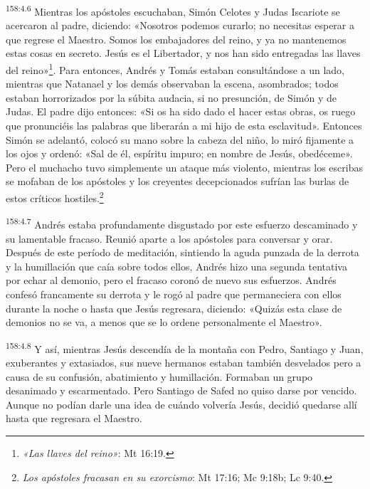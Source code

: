 \par
\textsuperscript{158:4.6} Mientras los apóstoles escuchaban, Simón Celotes y Judas Iscariote se acercaron al padre, diciendo: «Nosotros podemos curarlo; no necesitas esperar a que regrese el Maestro. Somos los embajadores del reino, y ya no mantenemos estas cosas en secreto. Jesús es el Libertador, y nos han sido entregadas las llaves del reino»\footnote{\textit{«Las llaves del reino»}: Mt 16:19.}. Para entonces, Andrés y Tomás estaban consultándose a un lado, mientras que Natanael y los demás observaban la escena, asombrados; todos estaban horrorizados por la súbita audacia, si no presunción, de Simón y de Judas. El padre dijo entonces: «Si os ha sido dado el hacer estas obras, os ruego que pronunciéis las palabras que liberarán a mi hijo de esta esclavitud». Entonces Simón se adelantó, colocó su mano sobre la cabeza del niño, lo miró fijamente a los ojos y ordenó: «Sal de él, espíritu impuro; en nombre de Jesús, obedéceme». Pero el muchacho tuvo simplemente un ataque más violento, mientras los escribas se mofaban de los apóstoles y los creyentes decepcionados sufrían las burlas de estos críticos hostiles.\footnote{\textit{Los apóstoles fracasan en su exorcismo}: Mt 17:16; Mc 9:18b; Lc 9:40.}

\par
\textsuperscript{158:4.7} Andrés estaba profundamente disgustado por este esfuerzo descaminado y su lamentable fracaso. Reunió aparte a los apóstoles para conversar y orar. Después de este período de meditación, sintiendo la aguda punzada de la derrota y la humillación que caía sobre todos ellos, Andrés hizo una segunda tentativa por echar al demonio, pero el fracaso coronó de nuevo sus esfuerzos. Andrés confesó francamente su derrota y le rogó al padre que permaneciera con ellos durante la noche o hasta que Jesús regresara, diciendo: «Quizás esta clase de demonios no se va, a menos que se lo ordene personalmente el Maestro».

\par
\textsuperscript{158:4.8} Y así, mientras Jesús descendía de la montaña con Pedro, Santiago y Juan, exuberantes y extasiados, sus nueve hermanos estaban también desvelados pero a causa de su confusión, abatimiento y humillación. Formaban un grupo desanimado y escarmentado. Pero Santiago de Safed no quiso darse por vencido. Aunque no podían darle una idea de cuándo volvería Jesús, decidió quedarse allí hasta que regresara el Maestro.


